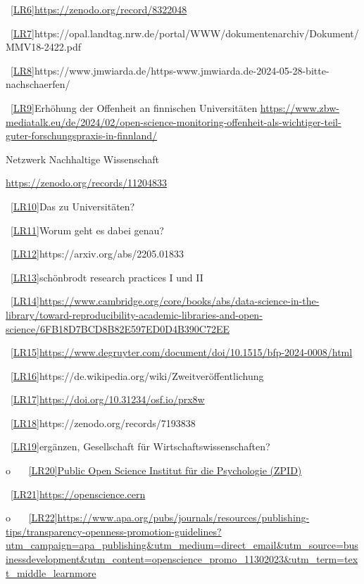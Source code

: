 \documentclass[
  letterpaper,
  DIV=11,
  numbers=noendperiod]{scrreprt}
\begin{document}
~\hyperref[_msoanchor_6]{{[}LR6{]}}\url{https://zenodo.org/record/8322048}~

~\hyperref[_msoanchor_7]{{[}LR7{]}}https://opal.landtag.nrw.de/portal/WWW/dokumentenarchiv/Dokument/MMV18-2422.pdf

~\hyperref[_msoanchor_8]{{[}LR8{]}}https://www.jmwiarda.de/https-www.jmwiarda.de-2024-05-28-bitte-nachschaerfen/

~\hyperref[_msoanchor_9]{{[}LR9{]}}Erhöhung der Offenheit an finnischen
Universitäten
\url{https://www.zbw-mediatalk.eu/de/2024/02/open-science-monitoring-offenheit-als-wichtiger-teil-guter-forschungspraxis-in-finnland/}

Netzwerk Nachhaltige Wissenschaft

\url{https://zenodo.org/records/11204833}

~\hyperref[_msoanchor_10]{{[}LR10{]}}Das zu Universitäten?

~\hyperref[_msoanchor_11]{{[}LR11{]}}Worum geht es dabei genau?

~\hyperref[_msoanchor_12]{{[}LR12{]}}https://arxiv.org/abs/2205.01833

~\hyperref[_msoanchor_13]{{[}LR13{]}}schönbrodt research practices I und
II

~\hyperref[_msoanchor_14]{{[}LR14{]}}\url{https://www.cambridge.org/core/books/abs/data-science-in-the-library/toward-reproducibility-academic-libraries-and-open-science/6FB18D7BCD8B82E597ED0D4B390C72EE}

~\hyperref[_msoanchor_15]{{[}LR15{]}}\url{https://www.degruyter.com/document/doi/10.1515/bfp-2024-0008/html}

~\hyperref[_msoanchor_16]{{[}LR16{]}}https://de.wikipedia.org/wiki/Zweitveröffentlichung

~\hyperref[_msoanchor_17]{{[}LR17{]}}\url{https://doi.org/10.31234/osf.io/prx8w}

~\hyperref[_msoanchor_18]{{[}LR18{]}}https://zenodo.org/records/7193838

~\hyperref[_msoanchor_19]{{[}LR19{]}}ergänzen, Gesellschaft für
Wirtschaftswissenschaften?

o~~
~\hyperref[_msoanchor_20]{{[}LR20{]}}\href{https://leibniz-psychology.org/das-institut}{Public
Open Science Institut für die Psychologie (ZPID)}

~\hyperref[_msoanchor_21]{{[}LR21{]}}\url{https://openscience.cern}

o~~
~\hyperref[_msoanchor_22]{{[}LR22{]}}\url{https://www.apa.org/pubs/journals/resources/publishing-tips/transparency-openness-promotion-guidelines?utm_campaign=apa_publishing&utm_medium=direct_email&utm_source=businessdevelopment&utm_content=openscience_promo_11302023&utm_term=text_middle_learnmore}
\end{document}
